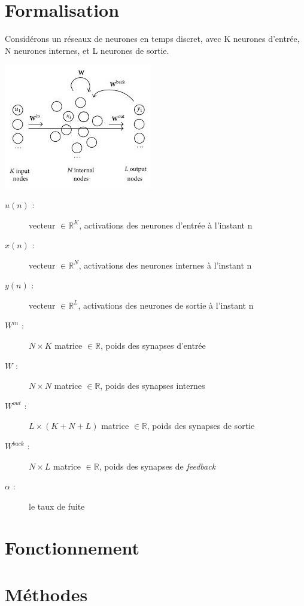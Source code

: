 \documentclass[12pt]{article}
\begin{document}
\section{Formalisation}
Considérons un réseaux de neurones en temps discret, avec K neurones d'entrée, N neurones internes, et L neurones de sortie.\newline
\begin{center}
\includegraphics[scale=0.5]{esn.jpeg}
\end{center}
\begin{description}
\item[$u(n)$ :] vecteur $\in \mathbb{R}^{K}$, activations des neurones d'entrée à l'instant n
\item[$x(n)$ :] vecteur $\in \mathbb{R}^{N}$, activations des neurones internes à l'instant n
\item[$y(n)$ :] vecteur $\in \mathbb{R}^{L}$, activations des neurones de sortie à l'instant n
\item[$W^{in}$ :] $N \times K$ matrice $\in \mathbb{R}$, poids des synapses d'entrée
\item[$W$ :] $N \times N$ matrice $\in \mathbb{R}$, poids des synapses internes
\item[$W^{out}$ :] $L \times (K + N + L)$ matrice $\in \mathbb{R}$, poids des synapses de sortie
\item[$W^{back}$ :] $N \times L$ matrice $\in \mathbb{R}$, poids des synapses de \textit{feedback}
\item[$\alpha$ :] le taux de fuite
\end{description} 

\section{Fonctionnement}


\section{Méthodes}
\end{document}
